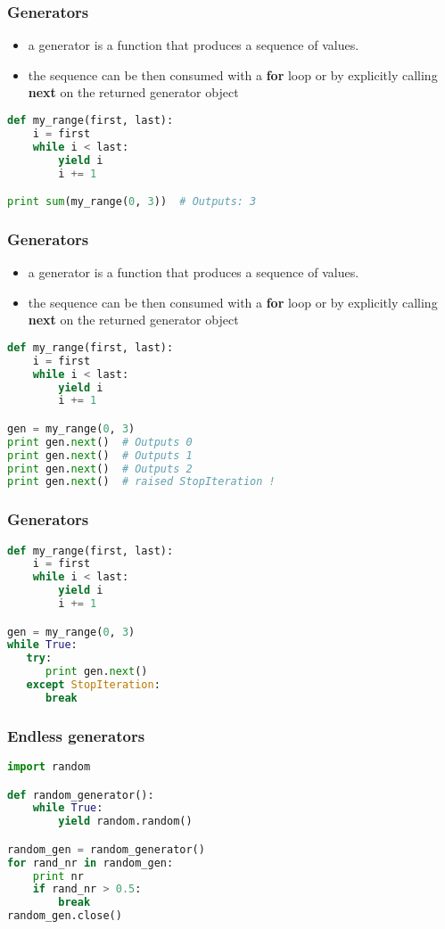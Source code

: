 \documentclass{beamer}
\begin{document}
\begin{frame}[fragile]
\frametitle{Generators}
\begin{itemize}
  \item a generator is a function that produces a sequence of values.
  \item the sequence can be then consumed with a {\bf for} loop or by explicitly
    calling {\bf next} on the returned generator object
\end{itemize}
\vspace{5 mm}
\begin{lstlisting}[language=python]
def my_range(first, last):
    i = first
    while i < last:
        yield i
        i += 1

print sum(my_range(0, 3))  # Outputs: 3
\end{lstlisting}
\end{frame}

\begin{frame}[fragile]
\frametitle{Generators}
\begin{itemize}
  \item a generator is a function that produces a sequence of values.
  \item the sequence can be then consumed with a {\bf for} loop or by explicitly
    calling {\bf next} on the returned generator object
\end{itemize}
\vspace{5 mm}
\begin{lstlisting}[language=python]
def my_range(first, last):
    i = first
    while i < last:
        yield i
        i += 1

gen = my_range(0, 3)
print gen.next()  # Outputs 0
print gen.next()  # Outputs 1
print gen.next()  # Outputs 2
print gen.next()  # raised StopIteration !
\end{lstlisting}
\end{frame}

\begin{frame}[fragile]
\frametitle{Generators}
\vspace{5 mm}
\begin{lstlisting}[language=python]
def my_range(first, last):
    i = first
    while i < last:
        yield i
        i += 1

gen = my_range(0, 3)
while True:
   try:
      print gen.next()
   except StopIteration:
      break
\end{lstlisting}
\end{frame}

\begin{frame}[fragile]
\frametitle{Endless generators}
\vspace{5 mm}
\begin{lstlisting}[language=python]
import random

def random_generator():
    while True:
        yield random.random()

random_gen = random_generator()
for rand_nr in random_gen:
    print nr
    if rand_nr > 0.5:
        break
random_gen.close()
\end{lstlisting}
\end{frame}
\end{document}
